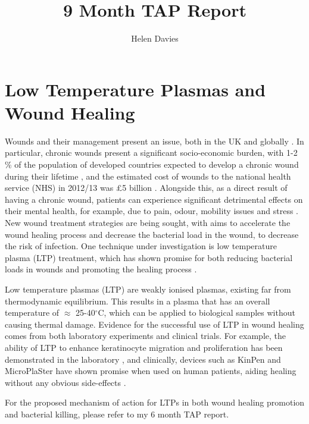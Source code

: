 \documentclass[11pt, oneside]{article}   	%
\title{9 Month TAP Report}
\author{Helen Davies}
\date{}							%
\begin{document}
\maketitle

\section{Low Temperature Plasmas and Wound Healing}
Wounds and their management present an issue, both in the UK and globally \cite{Posnett2008the}. 
In particular, chronic wounds present a significant socio-economic burden, with 1-2 \% of the population of developed countries expected to develop a chronic wound during their lifetime \cite{Siddiqui2010chronic}, and the estimated cost of wounds to the national health service (NHS) in 2012/13 was \pounds5 billion \cite{Guest2015health}.
Alongside this, as a direct result of having a chronic wound, patients can experience significant detrimental effects on their mental health, for example, due to pain, odour, mobility issues and stress \cite{Persoon2004leg}.
New wound treatment strategies are being sought, with aims to accelerate the wound healing process and decrease the bacterial load in the wound, to decrease the risk of infection.
One technique under investigation is low temperature plasma (LTP) treatment, which has shown promise for both reducing bacterial loads in wounds and promoting the healing process \cite{Kong2009plasma, Kramer2013suitability, Isbary2012successful, Isbary2010a}.

Low temperature plasmas (LTP) are weakly ionised plasmas, existing far from thermodynamic equilibrium.
This results in a plasma that has an overall temperature of $\approx$ 25-40$^\circ$C, which can be applied to biological samples without causing thermal damage. 
Evidence for the successful use of LTP in wound healing comes from both laboratory experiments and clinical trials.
For example, the ability of LTP to enhance keratinocyte migration and proliferation has been demonstrated in the laboratory \cite{Tipa2011plasma}, and clinically, devices such as KinPen and MicroPlaSter have shown promise when used on human patients, aiding healing without any obvious side-effects \cite{Isbary2013cold, Isbary2012successful, Isbary2010a, Bekeschus2016the}.

For the proposed mechanism of action for LTPs in both wound healing promotion and bacterial killing, please refer to my 6 month TAP report.
\end{document}

